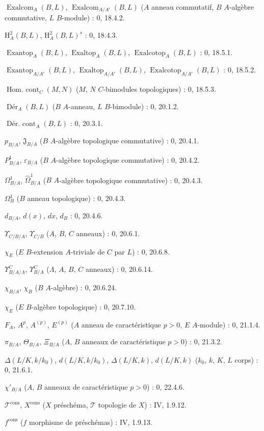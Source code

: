 $\operatorname{Exalcom}_A(B,L)$, $\operatorname{Exalcom}_{A/A'}(B,L)$ ($A$ anneau commutatif, $B$ $A$-algèbre commutative, $L$ $B$-module) : 0, 18.4.2.\par
$\mathrm H_A^2(B,L)$, $\mathrm H_A^2(B,L)^s$ : 0, 18.4.3.\par
$\operatorname{Exantop}_A(B,L)$, $\operatorname{Exaltop}_A(B,L)$,
$\operatorname{Exalcotop}_A(B,L)$ : 0, 18.5.1.\par
$\operatorname{Exantop}_{A/A'}(B,L)$, $\operatorname{Exaltop}_{A/A'}(B,L)$,
$\operatorname{Exalcotop}_{A/A'}(B,L)$ : 0, 18.5.2.\par
$\operatorname{Hom.\ cont}_C(M,N)$ ($M$, $N$ $C$-bimodules topologiques) : 0, 18.5.3.\par
$\operatorname{Dér}_A(B,L)$ ($B$ $A$-anneau, $L$ $B$-bimodule) : 0, 20.1.2.\par
$\operatorname{Dér.\ cont}_A(B,L)$ : 0, 20.3.1.\par
$p_{B/A}$, $\mathfrak J_{B/A}$ ($B$ $A$-algèbre topologique commutative) : 0, 20.4.1.\par
$P^1_{B/A}$, $\varepsilon_{B/A}$ ($B$ $A$-algèbre topologique commutative) : 0, 20.4.2.\par
$\Omega^1_{B/A}$, $\widehat{\Omega}^1_{B/A}$ ($B$ $A$-algèbre topologique commutative) : 0, 20.4.3.\par
$\Omega^1_B$ ($B$ anneau topologique) : 0, 20.4.3.\par
$d_{B/A}$, $d(x)$, $dx$, $d_B$ : 0, 20.4.6.\par
$\Upsilon_{C/B/A}$, $\Upsilon_{C/B}$ ($A$, $B$, $C$ anneaux) : 0, 20.6.1.\par
$\chi_E$ ($E$ $B$-extension $A$-triviale de $C$ par $L$) : 0, 20.6.8.\par

\clearpage
{}
$\Upsilon^C_{B/A/\Lambda}$, $\Upsilon^C_{B/A}$ ($\Lambda$, $A$, $B$, $C$ anneaux) : 0, 20.6.14.\par
$\chi_{B/A}$, $\chi_B$ ($B$ $A$-algèbre) : 0, 20.6.24.\par
$\chi_E$ ($E$ $B$-algèbre topologique) : 0, 20.7.10.\par
$F_A$, $A^p$, $A^{(p)}$, $E^{(p)}$ ($A$ anneau de caractéristique $p>0$, $E$ $A$-module) : 0, 21.1.4.\par
$\pi_{B/A}$, $\Theta_{B/A}$, $\Xi_{B/A}$ ($A$, $B$ anneaux de caractéristique $p>0$) : 0, 21.3.2.\par
$\Delta(L/K,k/k_0)$, $d(L/K,k/k_0)$, $\Delta(L/K,k)$, $d(L/K,k)$ ($k_0$, $k$, $K$, $L$ corps) : 0, 21.6.1.\par
$\chi'_{B/A}$ ($A$, $B$ anneaux de caractéristique $p>0$) : 0, 22.4.6.\par
$\mathscr T^{\mathrm{cons}}$, $X^{\mathrm{cons}}$ ($X$ préschéma, $\mathscr T$ topologie de $X$) : IV, 1.9.12.\par
$f^{\mathrm{cons}}$ ($f$ morphisme de préschémas) : IV, 1.9.13.\par

